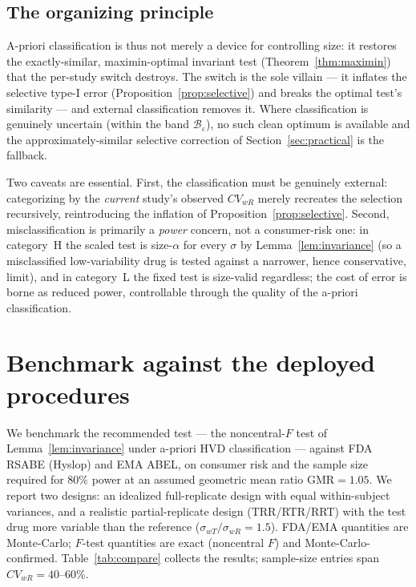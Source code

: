 \documentclass[11pt]{article}
\theoremstyle{remark}
\begin{document}
\subsection{The organizing principle}
A-priori classification is thus not merely a device for controlling size: it restores the exactly-similar, maximin-optimal invariant test (Theorem~\ref{thm:maximin}) that the per-study switch destroys. The switch is the sole villain --- it inflates the selective type-I error (Proposition~\ref{prop:selective}) and breaks the optimal test's similarity --- and external classification removes it. Where classification is genuinely uncertain (within the band $\mathcal{B}_\varepsilon$), no such clean optimum is available and the approximately-similar selective correction of Section~\ref{sec:practical} is the fallback.

Two caveats are essential. First, the classification must be genuinely external: categorizing by the \emph{current} study's observed $CV_{wR}$ merely recreates the selection recursively, reintroducing the inflation of Proposition~\ref{prop:selective}. Second, misclassification is primarily a \emph{power} concern, not a consumer-risk one: in category~H the scaled test is size-$\alpha$ for every $\sigma$ by Lemma~\ref{lem:invariance} (so a misclassified low-variability drug is tested against a narrower, hence conservative, limit), and in category~L the fixed test is size-valid regardless; the cost of error is borne as reduced power, controllable through the quality of the a-priori classification.

\section{Benchmark against the deployed procedures}\label{sec:benchmark}

We benchmark the recommended test --- the noncentral-$F$ test of Lemma~\ref{lem:invariance} under a-priori HVD classification --- against FDA RSABE (Hyslop) and EMA ABEL, on consumer risk and the sample size required for $80\%$ power at an assumed geometric mean ratio $\mathrm{GMR}=1.05$. We report two designs: an idealized full-replicate design with equal within-subject variances, and a realistic partial-replicate design (TRR/RTR/RRT) with the test drug more variable than the reference ($\sigma_{wT}/\sigma_{wR}=1.5$). FDA/EMA quantities are Monte-Carlo; $F$-test quantities are exact (noncentral $F$) and Monte-Carlo-confirmed. Table~\ref{tab:compare} collects the results; sample-size entries span $CV_{wR}=40$--$60\%$.
\end{document}
